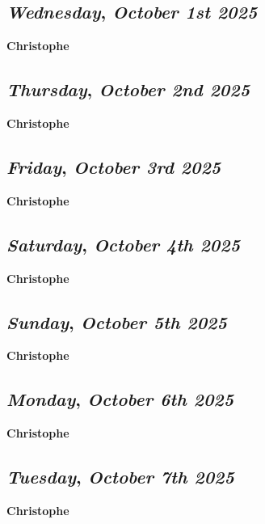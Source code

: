\begin{center}
\section*{\month}
\end{center}

\def\day{\textit{October 1st 2025}}
\def\weekday{\textit{Wednesday}}
\subsection*{\weekday, \day}
\textbf {Christophe}

\def\day{\textit{October 2nd 2025}}
\def\weekday{\textit{Thursday}}
\subsection*{\weekday, \day}
\textbf {Christophe}

\def\day{\textit{October 3rd 2025}}
\def\weekday{\textit{Friday}}
\subsection*{\weekday, \day}
\textbf {Christophe}

\def\day{\textit{October 4th 2025}}
\def\weekday{\textit{Saturday}}
\subsection*{\weekday, \day}
\textbf {Christophe}

\def\day{\textit{October 5th 2025}}
\def\weekday{\textit{Sunday}}
\subsection*{\weekday, \day}
\textbf {Christophe}

\def\day{\textit{October 6th 2025}}
\def\weekday{\textit{Monday}}
\subsection*{\weekday, \day}
\textbf {Christophe}

\def\day{\textit{October 7th 2025}}
\def\weekday{\textit{Tuesday}}
\subsection*{\weekday, \day}
\textbf {Christophe}

\def\day{\textit{October 8th 2025}}
\def\weekday{\textit{Wednesday}}
